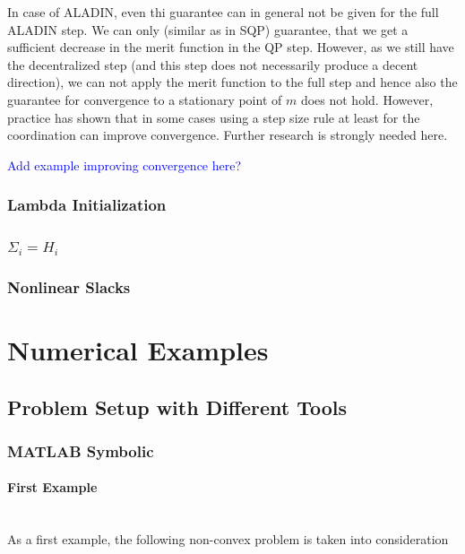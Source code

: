 \documentclass[]{scrartcl}
\begin{document}
In case of ALADIN, even thi guarantee can in general not be given for the full ALADIN step.
We can only (similar as in SQP) guarantee, that we get a sufficient decrease in the merit function in the QP step.
However, as we still have the decentralized step (and this step does not necessarily produce a decent direction), we can not apply the merit function to the full step and hence also the guarantee for convergence to a stationary point of $m$ does not hold. 
However, practice has shown that in some cases using a step size rule at least for the coordination can improve convergence.
Further research is strongly needed here. 

\textcolor{blue}{Add example improving convergence here?}

\subsubsection{Lambda Initialization}
\subsubsection{$\Sigma_i=H_i$}
\subsubsection{Nonlinear Slacks}



\section{Numerical Examples}
\subsection{Problem Setup with Different Tools}
\subsubsection{MATLAB Symbolic}
\paragraph{First Example} \\
As a first example, the following non-convex problem is taken into consideration
\end{document}

